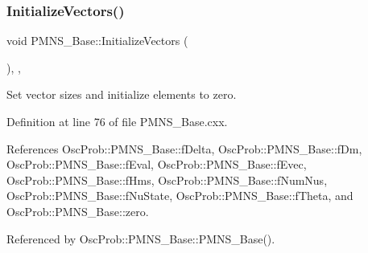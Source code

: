\subsubsection{\texorpdfstring{Initialize\+Vectors()}{InitializeVectors()}}
{\footnotesize\ttfamily void P\+M\+N\+S\+\_\+\+Base\+::\+Initialize\+Vectors (\begin{DoxyParamCaption}{ }\end{DoxyParamCaption})\hspace{0.3cm}{\ttfamily [protected]}, {\ttfamily [virtual]}, {\ttfamily [inherited]}}

Set vector sizes and initialize elements to zero. 

Definition at line 76 of file P\+M\+N\+S\+\_\+\+Base.\+cxx.



References Osc\+Prob\+::\+P\+M\+N\+S\+\_\+\+Base\+::f\+Delta, Osc\+Prob\+::\+P\+M\+N\+S\+\_\+\+Base\+::f\+Dm, Osc\+Prob\+::\+P\+M\+N\+S\+\_\+\+Base\+::f\+Eval, Osc\+Prob\+::\+P\+M\+N\+S\+\_\+\+Base\+::f\+Evec, Osc\+Prob\+::\+P\+M\+N\+S\+\_\+\+Base\+::f\+Hms, Osc\+Prob\+::\+P\+M\+N\+S\+\_\+\+Base\+::f\+Num\+Nus, Osc\+Prob\+::\+P\+M\+N\+S\+\_\+\+Base\+::f\+Nu\+State, Osc\+Prob\+::\+P\+M\+N\+S\+\_\+\+Base\+::f\+Theta, and Osc\+Prob\+::\+P\+M\+N\+S\+\_\+\+Base\+::zero.



Referenced by Osc\+Prob\+::\+P\+M\+N\+S\+\_\+\+Base\+::\+P\+M\+N\+S\+\_\+\+Base().


